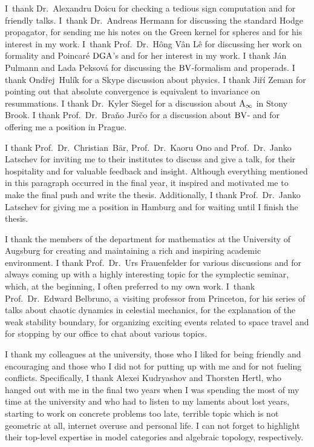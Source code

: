 \documentclass[\MainFolder/Text.tex]{subfiles}
\begin{document}
I~thank Dr.~Alexandru Doicu for checking a tedious sign computation and for friendly talks. I~thank Dr.~Andreas Hermann for discussing the standard Hodge propagator, for sending me his notes on the Green kernel for spheres and for his interest in my work. I~thank Prof.~Dr.~Hông Vân Lê for discussing her work on formality and Poincar\'e $\mathrm{DGA}$'s and for her interest in my work. I thank J\'an Pulmann and Lada Peksov\'a for discussing the $\mathrm{BV}$-formalism and properads. I thank Ond\v{r}ej~Hul\'ik for a Skype discussion about physics. I thank Ji\v{r}\'i Zeman for pointing out that absolute convergence is equivalent to invariance on resummations. I thank Dr.~Kyler Siegel for a discussion about $\mathrm{A}_\infty$ in Stony Brook. I thank Prof.~Dr.~Bra\v{n}o Jur\v{c}o for a discussion about $\mathrm{BV}$- and for offering me a position in Prague.

I thank Prof.~Dr.~Christian~B\"ar, Prof.~Dr.~Kaoru Ono and Prof.~Dr.~Janko Latschev for inviting me to their institutes to discuss and give a talk, for their hospitality and for valuable feedback and insight. Although everything mentioned in this paragraph occurred in the final year, it inspired and motivated me to make the final push and write the thesis. Additionally, I thank Prof.~Dr.~Janko Latschev for giving me a position in Hamburg and for waiting until I finish the thesis.

I thank the members of the department for mathematics at the University of Augsburg for creating and maintaining a rich and inspiring academic environment. I thank Prof.~Dr.~Urs Frauenfelder for various discussions and for always coming up with a highly interesting topic for the symplectic seminar, which, at the beginning, I often preferred to my own work. I~thank Prof.~Dr.~Edward Belbruno, a~visiting professor from Princeton, for his series of talks about chaotic dynamics in celestial mechanics, for the explanation of the weak stability boundary, for organizing exciting events related to space travel and for stopping by our office to chat about various topics.

I thank my colleagues at the university, those who I liked for being friendly and encouraging and those who I did not for putting up with me and for not fueling conflicts. Specifically, I thank Alexei Kudryashov and Thorsten Hertl, who hanged out with me in the final two years when I was spending the most of my time at the university and who had to listen to my laments about lost years, starting to work on concrete problems too late, terrible topic which is not geometric at all, internet overuse and personal life. I can not forget to highlight their top-level expertise in model categories and algebraic topology, respectively.
\end{document}
